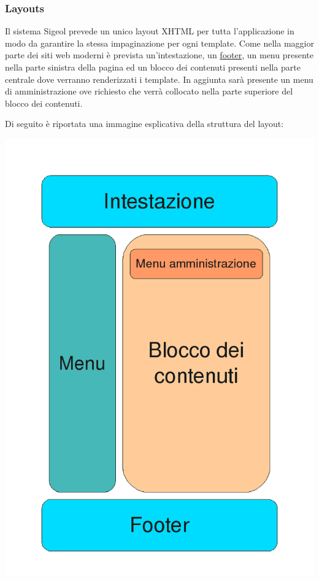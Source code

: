 \documentclass[11pt,a4paper]{article}
\begin{document}
\subsubsection{Layouts}
Il sistema Sigeol prevede un unico layout XHTML per tutta l'applicazione in modo da garantire la stessa impaginazione per ogni template. Come nella maggior parte dei siti web moderni è prevista un'intestazione, un \underline{footer}, un menu presente nella parte sinistra della pagina ed un blocco dei contenuti presenti nella parte centrale dove verranno renderizzati i template. In aggiunta sarà presente un menu di amministrazione ove richiesto che verrà collocato nella parte superiore del blocco dei contenuti.

Di seguito è riportata una immagine esplicativa della struttura del layout:
\begin{center}
 \includegraphics[scale=0.40]{images/layout.png}
\end{center}
\end{document}
